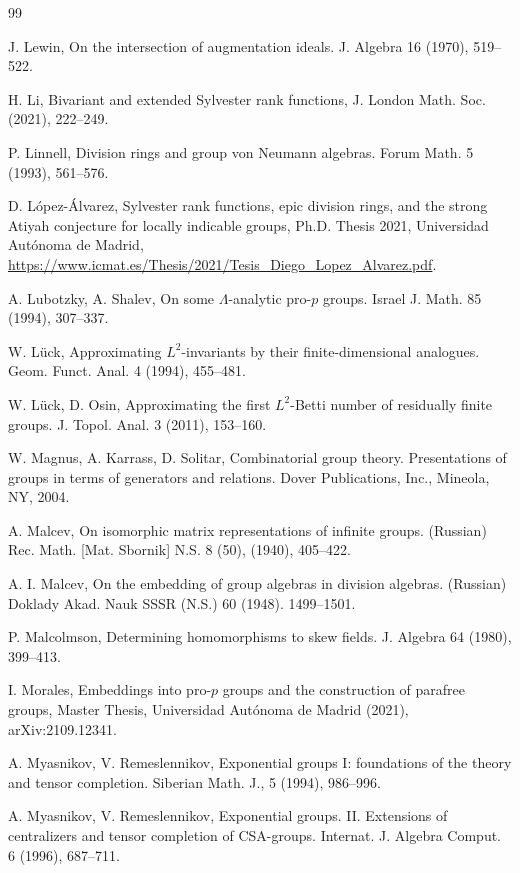 \documentclass[11pt]{amsart}
\numberwithin{claimcounter}{lem}
\begin{document}
\begin{thebibliography}{99}
  
    J. Lewin,  On the intersection of augmentation ideals. J. Algebra 16 (1970), 519--522.
  
   
 H. Li, 	Bivariant and extended Sylvester rank functions,  J. London Math. Soc. (2021),   222--249.
  
   P. Linnell,  Division rings and group von Neumann algebras. Forum Math. 5 (1993),   561--576.
  
   D. L\'opez-\'Alvarez, Sylvester rank functions, epic division rings, and the strong Atiyah conjecture for locally indicable groups,  Ph.D. Thesis 2021,  Universidad Aut\'onoma de Madrid, \url{https://www.icmat.es/Thesis/2021/Tesis_Diego_Lopez_Alvarez.pdf}.
  
  
     A. Lubotzky,  A. Shalev,  
On some $\Lambda$-analytic pro-$p$ groups.  
Israel J. Math. 85 (1994),  307--337.
  
   W. L\"uck,  Approximating $L^ 2$-invariants by their
finite-dimensional analogues. Geom. Funct. Anal. 4 (1994),  455--481.

 W. L\"uck,  D. Osin, 
Approximating the first $L^2$-Betti number of residually finite groups. J. Topol. Anal. 3 (2011),   153--160. 

  W. Magnus,  A. Karrass,  D. Solitar,   Combinatorial group theory. Presentations of groups in terms of generators and relations.  Dover Publications, Inc., Mineola, NY, 2004. 
 

  A. Malcev,  On isomorphic matrix representations of infinite groups. (Russian) Rec. Math. [Mat. Sbornik] N.S. 8 (50), (1940), 405--422.

 A. I. Malcev, On the embedding of group algebras in division algebras. (Russian) Doklady Akad. Nauk SSSR (N.S.) 60 (1948). 1499--1501. 

  P. Malcolmson,  Determining homomorphisms to skew fields. J. Algebra 64 (1980),   399--413.

 I. Morales, Embeddings into pro-$p$ groups and the construction of parafree groups, Master Thesis, Universidad Aut\'onoma de Madrid (2021), arXiv:2109.12341.

 A.  Myasnikov, V. Remeslennikov,  Exponential groups I: foundations
of the theory and tensor completion. Siberian Math. J., 5 (1994),  986--996.
  
   A.  Myasnikov, V. Remeslennikov,  Exponential groups. II. Extensions of centralizers and tensor completion of CSA-groups. Internat. J. Algebra Comput. 6 (1996),  687--711. 
  

\end{thebibliography}
\end{document}
